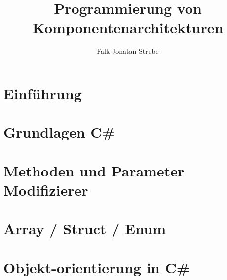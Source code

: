 \documentclass{scrreprt}
\title{Programmierung von Komponentenarchitekturen}
\author{Falk-Jonatan Strube}
\begin{document}
\maketitle
\tableofcontents


\chapter{Einführung}


\chapter{Grundlagen C\#}


\chapter{Methoden und Parameter Modifizierer}


\chapter{Array / Struct / Enum}


\chapter{Objekt-orientierung in C\#}

\end{document}

